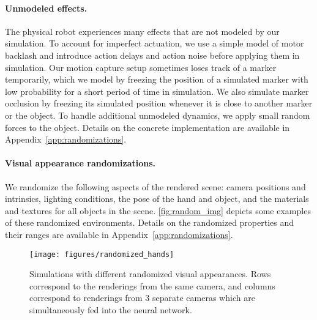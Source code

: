 \paragraph{Unmodeled effects.}
The physical robot experiences many effects that are not modeled by our simulation.
To account for imperfect actuation, we use a simple model of motor backlash and introduce action delays and action noise before applying them in simulation.
Our motion capture setup sometimes loses track of a marker temporarily, which we model by freezing the position of a simulated marker with low probability for a short period of time in simulation.
We also simulate marker occlusion by freezing its simulated position whenever
it is close to another marker or the object.
To handle additional unmodeled dynamics, we apply small random forces to the object.
Details on the concrete implementation are available in Appendix~\ref{app:randomizations}.

\paragraph{Visual appearance randomizations.}
 We randomize the following aspects of the rendered scene:
camera positions and intrinsics, lighting conditions, the pose of the hand and object, and the materials and textures for all objects in the scene.
\autoref{fig:random_img} depicts some examples of these randomized environments.
Details on the randomized properties and their ranges are available in Appendix~\ref{app:randomizations}.

\begin{figure}[h]
    \begin{center}
    \texttt{[image: figures/randomized\_hands]}
    \caption{Simulations with different randomized visual appearances. Rows correspond to the renderings from the same camera, and columns correspond to renderings from 3 separate cameras which are simultaneously fed into the neural network.}
    \label{fig:random_img}    
    \end{center}
\end{figure}